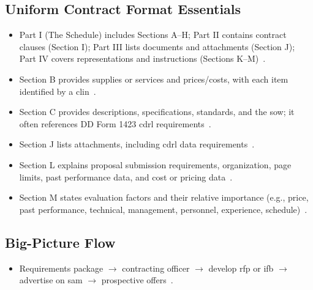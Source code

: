 \documentclass[../main.tex]{subfiles}
\begin{document}
\subsection{Uniform Contract Format Essentials}
\begin{itemize}
  \item Part I (The Schedule) includes Sections A--H; Part II contains contract clauses (Section I); Part III lists documents and attachments (Section J); Part IV covers representations and instructions (Sections K--M)~\autocite{edo-3-2-2-solicitation-prep-2025}.
  \item Section B provides supplies or services and prices/costs, with each item identified by a \ac{clin}~\autocite{edo-3-2-2-solicitation-prep-2025}.
  \item Section C provides descriptions, specifications, standards, and the \ac{sow}; it often references DD Form 1423 \ac{cdrl} requirements~\autocite{edo-3-2-2-solicitation-prep-2025}.
  \item Section J lists attachments, including \ac{cdrl} data requirements~\autocite{edo-3-2-2-solicitation-prep-2025}.
  \item Section L explains proposal submission requirements, organization, page limits, past performance data, and cost or pricing data~\autocite{edo-3-2-2-solicitation-prep-2025}.
  \item Section M states evaluation factors and their relative importance (e.g., price, past performance, technical, management, personnel, experience, schedule)~\autocite{edo-3-2-2-solicitation-prep-2025}.
\end{itemize}

\subsection{Big-Picture Flow}
\begin{itemize}
  \item Requirements package \(\rightarrow\) contracting officer \(\rightarrow\) develop \ac{rfp} or \ac{ifb} \(\rightarrow\) advertise on \ac{sam} \(\rightarrow\) prospective offers~\autocite{edo-3-2-2-solicitation-prep-2025}.
\end{itemize}
\end{document}
